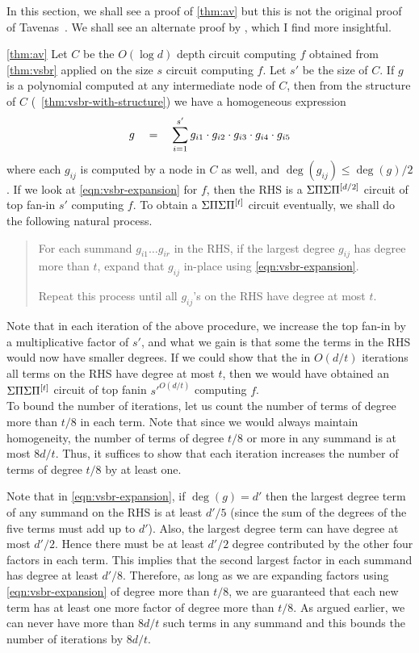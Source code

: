 In this section, we shall see a proof of \autoref{thm:av} but this is not the original proof of Tavenas~\cite{Tav13}. 
We shall see an alternate proof by \cite{saptharishivinay14}, which I find more insightful. 

\begin{proofof}{\autoref{thm:av}}
Let $C$ be the $O(\log d)$ depth  circuit computing $f$ obtained from \autoref{thm:vsbr} applied on the size $s$ circuit computing $f$. 
Let $s'$ be the size of $C$. 
If $g$ is a polynomial computed at any intermediate node of $C$, then from the structure of $C$ (~\autoref{thm:vsbr-with-structure}) we have a homogeneous expression
\begin{equation}\label{eqn:vsbr-expansion}
g \quad = \quad \sum_{i=1}^{s'} g_{i1} \cdot g_{i2} \cdot g_{i3} \cdot g_{i4} \cdot g_{i5} 
\end{equation}
where each $g_{ij}$ is computed by a node in $C$ as well, and $\deg(g_{ij}) \leq \deg(g)/2$. 
If we look at \eqref{eqn:vsbr-expansion} for $f$, then the RHS is a $\Sigma\Pi\Sigma\Pi^{[d/2]}$ circuit of top fan-in $s'$ computing $f$. 
To obtain a $\Sigma\Pi\Sigma\Pi^{[t]}$ circuit eventually, we shall do the following natural process. 
\begin{quote}
  For each summand $g_{i1}\dots g_{ir}$ in the RHS, if the largest degree $g_{ij}$ has degree more than $t$, expand that $g_{ij}$ in-place using \eqref{eqn:vsbr-expansion}. 
  
  Repeat this process until all $g_{ij}$'s on the RHS have degree at most $t$. 
\end{quote}

Note that in each iteration of the above procedure, we increase the top fan-in by a multiplicative factor of $s'$, and what we gain is that some the terms in the RHS would now have smaller degrees. 
If we could show that the in $O(d/t)$  iterations  all terms on the RHS have degree at most $t$, then we would have obtained an $\Sigma\Pi\Sigma\Pi^{[t]}$ circuit of top fanin $s'^{O(d/t)}$ computing $f$. \\

To bound the number of iterations, let us count the number of terms of degree more than $t/8$ in each term. 
Note that since we would always maintain homogeneity, the number of terms of degree  $t/8$ or more in any summand  is at most $8d/t$. 
Thus, it suffices to show that each iteration increases the number of terms of degree $t/8$ by at least one. 

Note that in \eqref{eqn:vsbr-expansion}, if $\deg(g) = d'$ then the largest degree term of any summand on the RHS is at least $d'/5$ (since the sum of the degrees of the five terms must add up to $d'$). 
Also, the largest degree term can have degree at most $d'/2$. 
Hence there must be at least $d'/2$ degree contributed by the other four factors in each term. 
This implies that the second largest factor in each summand has degree at least $d'/8$. 
Therefore, as long as we are expanding factors using \eqref{eqn:vsbr-expansion} of degree more than $t/8$, we are guaranteed that each new term has at least one more factor of degree more than $t/8$. 
As argued earlier, we can never have more than $8d/t$ such terms in any summand and this bounds the number of iterations by $8d/t$. 


\end{proofof}
